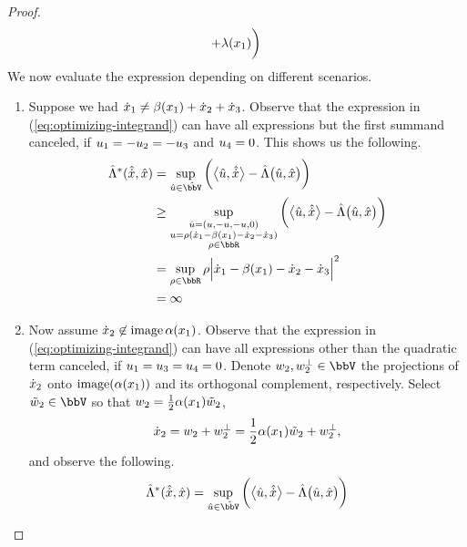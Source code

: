 \begin{proof}
\begin{align}
\begin{aligned}[t]
      + \lambda(x_1) \bigg)
    \end{aligned}
  \end{align}
  We now evaluate the expression depending on different scenarios.
  \begin{enumerate}
    \item
      Suppose we had $\dot{x}_1 \neq \beta(x_1) + \dot{x}_2 + \dot{x}_3$.
      Observe that the expression in (\ref{eq:optimizing-integrand}) can have all expressions but the first summand canceled, if $u_1 = -u_2 = -u_3$ and $u_4 = 0$.
      This shows us the following.
      \begin{align*}
        \hat\ode^*(\hat{\diffVar}, \hat\stateVar) 
        &= \sup_{\hat\momentVar \in \hat\vecSpace} \bigg( \bprj{\hat\momentVar}{\hat\diffVar} - \hat\ode\big(\hat\momentVar, \hat\stateVar\big) \bigg) \\
        &\geq \sup_{\substack{\hat\momentVar=(\momentVar, -\momentVar, -\momentVar, 0) \\ \momentVar = \rho (\diffVar_1 - \affDrift(\stateVar_1) - \diffVar_2 - \diffVar_3) \\ \rho \in \bbR}} \bigg( \bprj{\hat\momentVar}{\hat\diffVar} - \hat\ode\big(\hat\momentVar, \hat\stateVar\big) \bigg) \\
        &= \sup_{\rho\in\bbR} \rho \Big| \diffVar_1 - \affDrift(\stateVar_1) - \diffVar_2 - \diffVar_3 \Big|^2 \\
        &= \infty
      \end{align*}
    \item
      Now assume $\dot{x}_2 \not\in \operatorname{image}\alpha(x_1)$.
      Observe that the expression in (\ref{eq:optimizing-integrand}) can have all expressions other than the quadratic term canceled, if $u_1 = u_3 = u_4 = 0$. 
      Denote $w_2, w_2^\bot \in \vecSpace$ the projections of $\dot{x}_2$ onto $\operatorname{image}(\alpha(x_1))$ and its orthogonal complement, respectively.
      Select $\tilde w_2 \in \vecSpace$ so that $w_2 = \frac12\alpha(x_1) \tilde w_2$,
      \begin{equation*}
        \dot{x}_2 = w_2 + w_2^\bot = \frac12 \alpha(x_1) \tilde w_2 + w_2^\bot,
      \end{equation*}
      and observe the following.
      \begin{align*}
        \hat\ode^*(\hat{\diffVar}, \hat\stateVar) 
        &= \sup_{\hat\momentVar \in \hat\vecSpace} \bigg( \bprj{\hat\momentVar}{\hat\diffVar} - \hat\ode\big(\hat\momentVar, \hat\stateVar\big) \bigg) \\

\end{align*}
\end{enumerate}
\end{proof}
